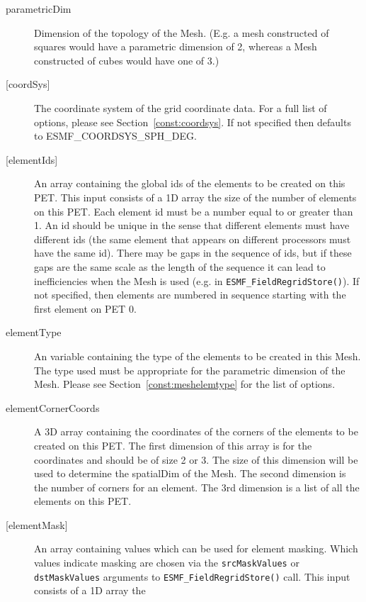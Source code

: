      \begin{description}
     \item [parametricDim]
           Dimension of the topology of the Mesh. (E.g. a mesh constructed of squares would
           have a parametric dimension of 2, whereas a Mesh constructed of cubes would have one
           of 3.)
     \item[{[coordSys]}]
           The coordinate system of the grid coordinate data.
           For a full list of options, please see Section~\ref{const:coordsys}.
           If not specified then defaults to ESMF\_COORDSYS\_SPH\_DEG.
     \item [{[elementIds]}]
            An array containing the global ids of the elements to be created on this PET.
            This input consists of a 1D array the size of the number of elements on this PET.
            Each element id must be a number equal to or greater than 1. An id should be
            unique in the sense that different elements must have different ids (the same element
            that appears on different processors must have the same id). There may be gaps in the sequence
            of ids, but if these gaps are the same scale as the length of the sequence it can lead to
            inefficiencies when the Mesh is used (e.g. in {\tt ESMF\_FieldRegridStore()}).
            If not specified, then elements are numbered in sequence starting with the first element
            on PET 0.
     \item[elementType]
            An variable containing the type of the elements to be created in this Mesh. The type used
            must be appropriate for the parametric dimension of the Mesh. Please see
            Section~\ref{const:meshelemtype} for the list of options.
     \item[elementCornerCoords]
           A 3D array containing the coordinates of the corners of the elements
           to be created on this PET. The first dimension of this array is for the
           coordinates and should be of size 2 or 3. The size of this dimension will be
           used to determine the spatialDim of the Mesh. The second dimension is the number
           of corners for an element. The 3rd dimension is a list of all the elements on this PET.
     \item [{[elementMask]}]
            An array containing values which can be used for element masking. Which values indicate
            masking are chosen via the {\tt srcMaskValues} or {\tt dstMaskValues} arguments to
            {\tt ESMF\_FieldRegridStore()} call. This input consists of a 1D array the

\end{description}
